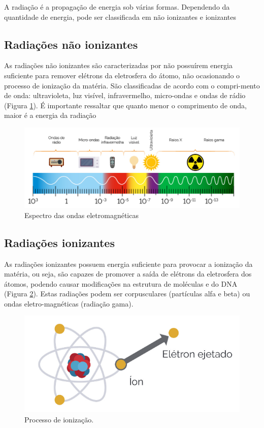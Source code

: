 \documentclass[11pt]{article}
\begin{document}
\begin{multicols}{2}
A  radiação  é  a  propagação  de  energia  sob  várias  formas.  Dependendo  da  quantidade de energia, pode ser classificada em não ionizantes e ionizantes

\subsection{Radiações não ionizantes}
\label{sec:orgc3a5f35}

As radiações não ionizantes são caracterizadas por não possuírem energia suficiente para remover elétrons da eletrosfera do átomo, não ocasionando o processo de ionização da matéria. São classificadas de acordo com o compri-mento de onda: ultravioleta, luz visível, infravermelho, micro-ondas e ondas de rádio  (Figura  \ref{espectro}).  É  importante  ressaltar  que  quanto  menor  o  comprimento  de  onda, maior é a energia da radiação

\begin{figure}[H]
\centering
\includegraphics[scale=0.3]{./../QM/espectro.png}
\caption{\label{espectro}Espectro das ondas eletromagnéticas}
\end{figure}


\subsection{Radiações ionizantes}
\label{sec:orga4ed6ba}

As radiações ionizantes possuem energia suficiente para provocar a ionização da matéria, ou seja, são capazes de promover a saída de elétrons da eletrosfera dos átomos, podendo causar modificações na estrutura de moléculas e do DNA (Figura \ref{ionizado}). Estas radiações podem ser corpusculares (partículas alfa e beta) ou ondas eletro-magnéticas (radiação gama).

\begin{figure}[H]
\centering
\includegraphics[scale=0.3]{./../QM/ionizado.png}
\caption{\label{ionizado}Processo de ionização.}
\end{figure}




\end{multicols}
\end{document}
